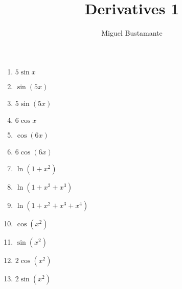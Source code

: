 \documentclass{article}
\title{Derivatives 1}
\author{Miguel Bustamante}
\begin{document}
\begin{multicols}{2}
\begin{enumerate}
    \item $5\sin x$
    \item $\sin(5x)$
    \item $5\sin(5x)$
    \item $6\cos x$
    \item $\cos(6x)$
    \item $6\cos(6x)$
    \item $\ln(1+x^2)$
    \item $\ln(1+x^2+x^3)$
    \item $\ln(1+x^2+x^3+x^4)$
    \item $\cos(x^2)$
    \item $\sin(x^2)$
    \item $2\cos(x^2)$
    \item $2\sin(x^2)$
\end{enumerate}
\end{multicols}
\end{document}
